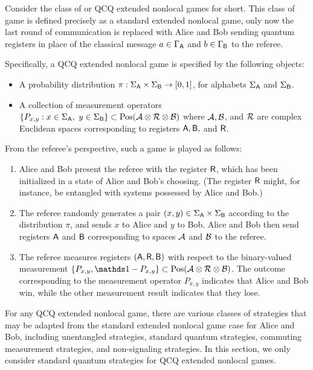 Consider the class of  or QCQ extended nonlocal games for short. This class of game is defined precisely as a standard extended nonlocal game, only now the last round of communication is replaced with Alice and Bob sending quantum registers in place of the classical message $a \in \Gamma_{\mathsf{A}}$ and $b \in \Gamma_{\mathsf{B}}$ to the referee. 

Specifically, a QCQ extended nonlocal game is specified by the following objects:
\begin{itemize}
	\item A probability distribution $\pi : \Sigma_{\mathsf{A}} \times \Sigma_{\mathsf{B}} \rightarrow [0,1]$, for alphabets $\Sigma_{\mathsf{A}}$ and $\Sigma_{\mathsf{B}}$. 
	\item A collection of measurement operators $\{P_{x,y} : x \in \Sigma_{\mathsf{A}}, \ y \in \Sigma_{\mathsf{B}} \} \subset \mathrm{Pos}(\mathcal{A} \otimes \mathcal{R} \otimes \mathcal{B})$ where $\mathcal{A},\mathcal{B}$, and $\mathcal{R}$ are complex Euclidean spaces corresponding to registers $\mathsf{A},\mathsf{B},$ and $\mathsf{R}$. 
\end{itemize}
From the referee's perspective, such a game is played as follows: 
\begin{enumerate}
	\item Alice and Bob present the referee with the register $\mathsf{R}$, which has been initialized in a state of Alice and Bob's choosing. (The register $\mathsf{R}$ might, for instance, be entangled with systems possessed by Alice and Bob.)
	\item The referee randomly generates a pair $(x,y) \in \Sigma_{\mathsf{A}} \times \Sigma_{\mathsf{B}}$ according to the distribution $\pi$, and sends $x$ to Alice and $y$ to Bob. Alice and Bob then send registers $\mathsf{A}$ and $\mathsf{B}$ corresponding to spaces $\mathcal{A}$ and $\mathcal{B}$ to the referee. 
	\item The referee measures registers $(\mathsf{A},\mathsf{R},\mathsf{B})$ with respect to the binary-valued measurement $\{P_{x,y}, \I - P_{x,y}\} \subset \Pos(\A \otimes \R \otimes \B)$. The outcome corresponding to the measurement operator $P_{x,y}$ indicates that Alice and Bob win, while the other measurement result indicates that they lose. 
\end{enumerate}
For any QCQ extended nonlocal game, there are various classes of strategies that may be adapted from the standard extended nonlocal game case for Alice and Bob, including unentangled strategies, standard quantum strategies, commuting measurement strategies, and non-signaling strategies. In this section, we only consider standard quantum strategies for QCQ extended nonlocal games.

